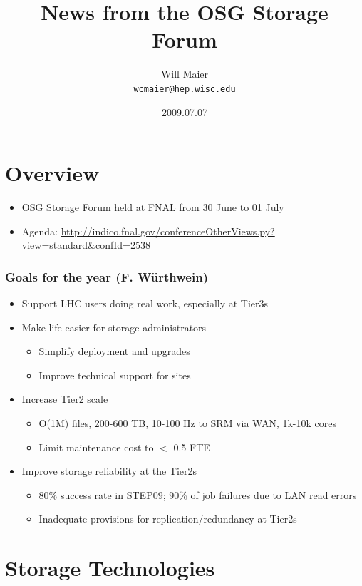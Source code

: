 \documentclass{beamer}
\title{News from the OSG Storage Forum}
\author[Maier]{
    Will Maier \\ 
    {\tt wcmaier@hep.wisc.edu}}
\institute[Wisconsin]{University of Wisconsin - High Energy Physics}
\date{2009.07.07}
\begin{document}
\begin{frame}
    \titlepage
\end{frame}

\section{Overview}
\begin{frame}
    \tableofcontents
\begin{itemize}
	\item OSG Storage Forum held at FNAL from 30 June to 01 July
	\item Agenda: \url{http://indico.fnal.gov/conferenceOtherViews.py?view=standard&confId=2538}
\end{itemize}
\end{frame}

\begin{frame}
\frametitle{Goals for the year (F. W\"urthwein)}
\begin{itemize}
	\item Support LHC users doing real work, especially at Tier3s
	\item Make life easier for storage administrators
	\begin{itemize}
		\item Simplify deployment and upgrades
		\item Improve technical support for sites
	\end{itemize}
	\item Increase Tier2 scale
	\begin{itemize}
		\item O(1M) files, 200-600 TB, 10-100 Hz to SRM via WAN, 1k-10k cores
		\item Limit maintenance cost to $<$ 0.5 FTE
	\end{itemize}
	\item Improve storage reliability at the Tier2s
	\begin{itemize}
		\item 80\% success rate in STEP09; 90\% of job failures due to LAN read errors
		\item Inadequate provisions for replication/redundancy at Tier2s
	\end{itemize}
\end{itemize}
\end{frame}

\section{Storage Technologies}
\end{document}
